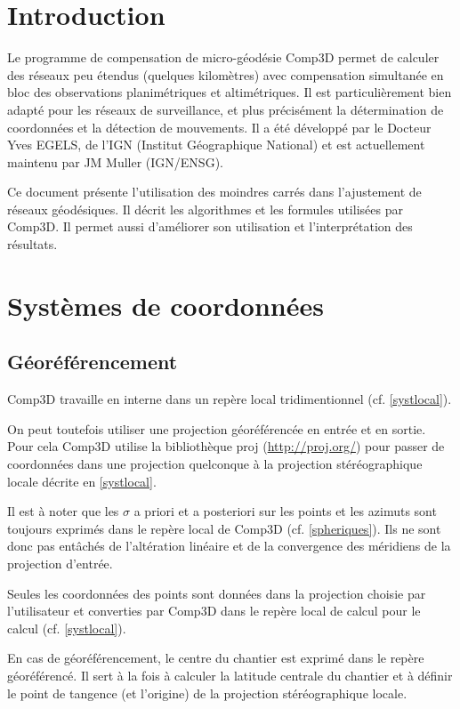 \documentclass[french]{report}
\begin{document}
\tableofcontents

\chapter*{Introduction}

Le programme de compensation de micro-géodésie Comp3D permet de calculer des réseaux peu étendus
(quelques kilomètres) avec compensation simultanée en bloc des observations planimétriques et altimétriques.
Il est particulièrement bien adapté pour les réseaux de surveillance, et plus précisément la
détermination de coordonnées et la détection de mouvements.
Il a été développé par le Docteur Yves EGELS, de l'IGN (Institut Géographique National) et est actuellement maintenu par JM Muller (IGN/ENSG).


Ce document présente l'utilisation des moindres carrés dans l'ajustement de réseaux géodésiques.
Il décrit les algorithmes et les formules utilisées par Comp3D. Il permet aussi d'améliorer son
utilisation et l'interprétation des résultats.


\chapter{Systèmes de coordonnées}
\section{Géoréférencement}

Comp3D travaille en interne dans un repère local tridimentionnel (cf. \ref{systlocal}).

On peut toutefois utiliser une projection géoréférencée en entrée et en sortie.
Pour cela Comp3D utilise la bibliothèque proj (\url{http://proj.org/}) pour passer de
coordonnées dans une projection quelconque à la projection stéréographique locale décrite en \ref{systlocal}.

Il est à noter que les $\sigma$ a priori et a posteriori sur les points et les azimuts sont toujours exprimés dans
le repère local de Comp3D (cf. \ref{spheriques}).
Ils ne sont donc pas entâchés de l'altération linéaire et de la convergence des méridiens de la projection d'entrée.

Seules les coordonnées des points sont données dans la projection choisie par l'utilisateur
et converties par Comp3D dans le repère local de calcul pour le calcul (cf. \ref{systlocal}).

En cas de géoréférencement, le centre du chantier est exprimé dans le repère géoréférencé.
Il sert à la fois à calculer la latitude centrale
du chantier et à définir le point de tangence (et l'origine) de la projection stéréographique locale.
\end{document}
